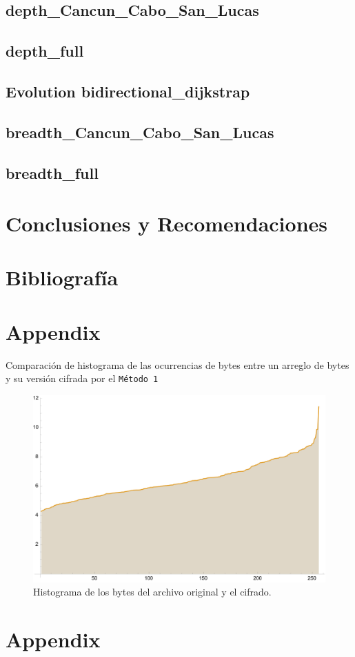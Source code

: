\subsection{depth\_Cancun\_Cabo\_San\_Lucas}

\subsection{depth\_full}

\subsection{Evolution bidirectional\_dijkstrap}

\subsection{breadth\_Cancun\_Cabo\_San\_Lucas}

\subsection{breadth\_full}



\newpage
\section{Conclusiones y Recomendaciones}


\newpage
\section{Bibliografía}
\printbibliography[heading=none]

\newpage
\appendix

\section{Appendix}

Comparación de histograma de las ocurrencias de bytes entre un arreglo de bytes
y su versión cifrada por el \texttt{Método 1}

\begin{figure}[H]
    \centering
    \includegraphics[scale=0.7]{../img/historygram}
    \caption*{Histograma de los bytes del archivo
original y el cifrado.}\label{fig:d2}
\end{figure}

\newpage
\section{Appendix}

